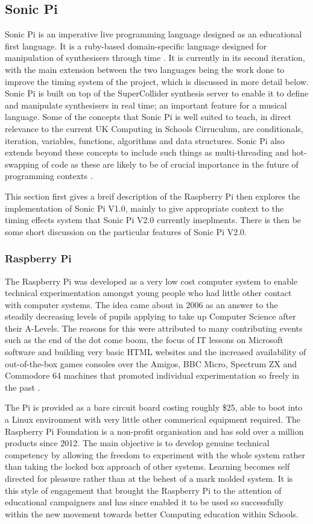 \documentclass[11pt]{scrartcl}
\begin{document}
\subsection{Sonic Pi}
Sonic Pi is an imperative live programming language designed as an educational 
first language. It is a ruby-based domain-specific language designed for 
manipulation of synthesisers through time \cite{AB13}. It is currently in its 
second iteration, with the main extension between the two languages being the 
work done to improve the timing system of the project, which is discussed in 
more detail below. Sonic Pi is built on top of the SuperCollider synthesis 
server to enable it to define and manipulate synthesisers in real time; an 
important feature for a musical language. Some of the concepts that Sonic Pi 
is well suited to teach, in direct relevance to the current UK Computing in 
Schools Cirruculum, are conditionals, iteration, variables, functions, 
algorithms and data structures. Sonic Pi also extends beyond these concepts to 
include such things as multi-threading and hot-swapping of code as these are 
likely to be of crucial importance in the future of programming contexts \cite{
AOB14}.

This section first gives a breif description of the Raspberry Pi then explores 
the implementation of Sonic Pi V1.0, mainly to give appropriate context to the 
timing effects system that Sonic Pi V2.0 currently imeplments. There is then 
be some short discussion on the particular features of Sonic Pi V2.0.

\subsubsection{Raspberry Pi}
The Raspberry Pi was developed as a very low cost computer system to enable 
technical experimentation amongst young people who had little other contact 
with computer systems. The idea came about in 2006 as an answer to the 
steadily decreasing levels of pupils applying to take up Computer Science 
after their A-Levels. The reasons for this were attributed to many 
contributing events such as the end of the dot come boom, the focus of IT 
lessons on Microsoft software and building very basic HTML websites and the 
increased availability of out-of-the-box games consoles over the Amigos, BBC 
Micro, Spectrum ZX and Commodore 64 machines that promoted individual 
experimentation so freely in the past \cite{rp}.

The Pi is provided as a bare circuit board costing roughly \$25, able to boot 
into a Linux environment with very little other commerical equipment required. 
The Raspberry Pi Foundation is a non-profit organisation and has sold over a 
million products since 2012. The main objective is to develop genuine 
technical competency by allowing the freedom to experiment with the whole 
system rather than taking the locked box approach of other systems. Learning 
becomes self directed for pleasure rather than at the behest of a mark molded 
system. It is this style of engagement that brought the Raspberry Pi to the 
attention of educational campaigners and has since enabled it to be used so 
successfully within the new movement towards better Computing education within 
Schools. 
\end{document}
